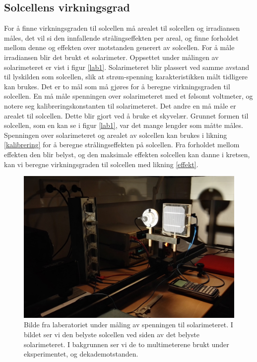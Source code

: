 \documentclass[%
 reprint,
 amsmath,amssymb,
 aps,
 norsk,
 booktabs
]{revtex4-1}
\begin{document}
\subsection{Solcellens virkningsgrad}
For å finne virkningsgraden til solcellen må arealet til solcellen og irradiansen måles, det vil si den innfallende strålingseffekten per areal, og finne forholdet mellom denne og effekten over motstanden generert av solcellen. For å måle irradiansen blir det brukt et solarimeter. Oppsettet under målingen av solarimeteret er vist i figur \vref{lab1}. Solarimeteret blir plassert ved samme avstand til lyskilden som solcellen, slik at strøm-spenning karakteristikken målt tidligere kan brukes. Det er to mål som må gjøres for å beregne virkningsgraden til solcellen. En må måle spenningen over solarimeteret med et følsomt voltmeter, og notere seg kalibreringskonstanten til solarimeteret. Det andre en må måle er arealet til solcellen. Dette blir gjort ved å bruke et skyvelær. Grunnet formen til solcellen, som en kan se i figur \vref{lab1}, var det mange lengder som måtte måles. Spenningen over solarimeteret og arealet av solcellen kan brukes i likning \eqref{kalibrering} for å beregne strålingseffekten på solcellen. Fra forholdet mellom effekten den blir belyst, og den maksimale effekten solcellen kan danne i kretsen, kan vi beregne virkningsgraden til solcellen med likning \eqref{effekt}.
\begin{figure}[h!]
  \centering
  \includegraphics[scale=0.065]{lab1.jpg}
  \caption{Bilde fra laberatoriet under måling av spenningen til solarimeteret. I bildet ser vi den belyste solcellen ved siden av det belyste solarimeteret. I bakgrunnen ser vi de to multimeterene brukt under eksperimentet, og dekademotstanden.}
  \label{lab1}
\end{figure}
\end{document}
